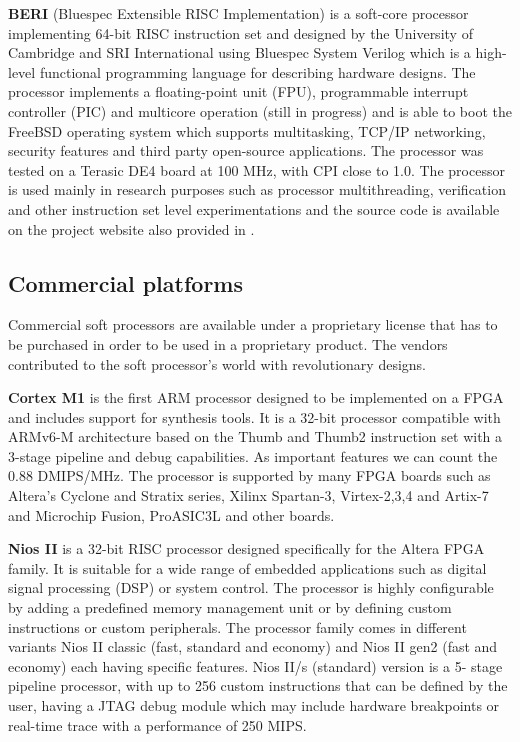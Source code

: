 \hspace{0.5cm} \textbf{BERI} (Bluespec Extensible RISC Implementation) is a soft-core processor implementing
64-bit RISC instruction set and designed by the University of Cambridge and SRI
International using Bluespec System Verilog which is a high-level functional programming
language for describing hardware designs. The processor implements a floating-point unit
(FPU), programmable interrupt controller (PIC) and multicore operation (still in progress)
and is able to boot the FreeBSD operating system which supports multitasking, TCP/IP
networking, security features and third party open-source applications. The processor was
tested on a Terasic DE4 board at 100 MHz, with CPI close to 1.0. The processor is used
mainly in research purposes such as processor multithreading, verification and other
instruction set level experimentations and the source code is available on the project website
also provided in \cite{4}.

\subsection{Commercial platforms}

\hspace{0.5cm} Commercial soft processors are available under a proprietary license that has to be
purchased in order to be used in a proprietary product. The vendors contributed to the soft
processor’s world with revolutionary designs.

\hspace{0.5cm} \textbf{Cortex M1} is the first ARM processor designed to be implemented on a FPGA and
includes support for synthesis tools. It is a 32-bit processor compatible with ARMv6-M
architecture based on the Thumb and Thumb2 instruction set with a 3-stage pipeline and
debug capabilities. As important features we can count the 0.88 DMIPS/MHz. The processor is supported by many FPGA boards such as Altera’s Cyclone and Stratix series, Xilinx
Spartan-3, Virtex-2,3,4 and Artix-7 and Microchip Fusion, ProASIC3L and other boards.

\hspace{0.5cm} \textbf{Nios II} is a 32-bit RISC processor designed specifically for the Altera FPGA family. It is
suitable for a wide range of embedded applications such as digital signal processing (DSP) or
system control. The processor is highly configurable by adding a predefined memory
management unit or by defining custom instructions or custom peripherals. The processor
family comes in different variants Nios II classic (fast, standard and economy) and Nios II
gen2 (fast and economy) each having specific features. Nios II/s (standard) version is a 5-
stage pipeline processor, with up to 256 custom instructions that can be defined by the user,
having a JTAG debug module which may include hardware breakpoints or real-time trace
with a performance of 250 MIPS.

